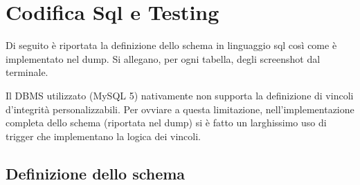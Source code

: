 \section{Codifica Sql e Testing} %
\label{sec:codifica_sql_e_testing}

Di seguito è riportata la definizione dello schema in linguaggio sql così come è implementato nel dump. Si allegano, per ogni tabella, degli screenshot dal terminale.

Il DBMS utilizzato (MySQL 5) nativamente non supporta la definizione di vincoli d'integrità personalizzabili. Per ovviare a questa limitazione, nell'implementazione completa dello schema (riportata nel dump) si è fatto un larghissimo uso di trigger che implementano la logica dei vincoli.

	\subsection{Definizione dello schema}
		
